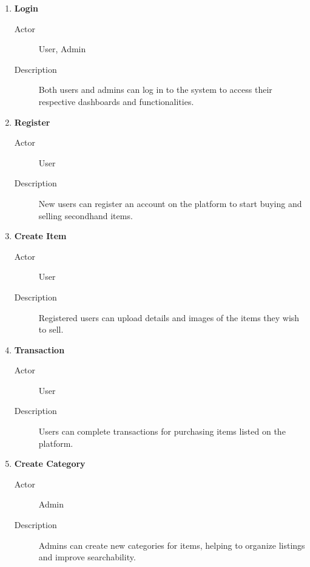 \begin{enumerate}
    \item \textbf{Login}
    \begin{description}
        \item[Actor] User, Admin 
        \item[Description] Both users and admins can log in to the system to access their respective dashboards and functionalities.
    \end{description}
    \item \textbf{Register}
    \begin{description}
        \item[Actor] User
        \item[Description] New users can register an account on the platform to start buying and selling secondhand items.
    \end{description}
    \item \textbf{Create Item}
    \begin{description}
        \item[Actor] User
        \item[Description] Registered users can upload details and images of the items they wish to sell.
    \end{description}
    \item \textbf{Transaction}
    \begin{description}
        \item[Actor] User
        \item[Description] Users can complete transactions for purchasing items listed on the platform.
    \end{description}
    \item \textbf{Create Category}
    \begin{description}
        \item[Actor] Admin
        \item[Description] Admins can create new categories for items, helping to organize listings and improve searchability.
    \end{description}
\end{enumerate}
